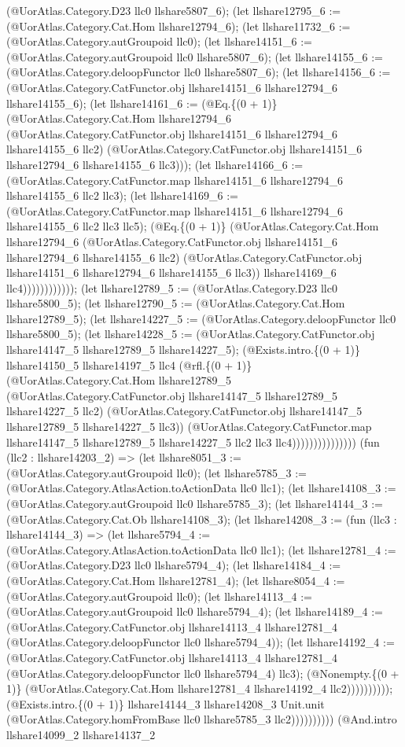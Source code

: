 \documentclass[11pt]{article}
\begin{document}
(@UorAtlas.Category.D23 llc0 llshare5807\_6); (let llshare12795\_6 := (@UorAtlas.Category.Cat.Hom llshare12794\_6); (let llshare11732\_6 := (@UorAtlas.Category.autGroupoid llc0); (let llshare14151\_6 := (@UorAtlas.Category.autGroupoid llc0 llshare5807\_6); (let llshare14155\_6 := (@UorAtlas.Category.deloopFunctor llc0 llshare5807\_6); (let llshare14156\_6 := (@UorAtlas.Category.CatFunctor.obj llshare14151\_6 llshare12794\_6 llshare14155\_6); (let llshare14161\_6 := (@Eq.\{(0 + 1)\} (@UorAtlas.Category.Cat.Hom llshare12794\_6 (@UorAtlas.Category.CatFunctor.obj llshare14151\_6 llshare12794\_6 llshare14155\_6 llc2) (@UorAtlas.Category.CatFunctor.obj llshare14151\_6 llshare12794\_6 llshare14155\_6 llc3))); (let llshare14166\_6 := (@UorAtlas.Category.CatFunctor.map llshare14151\_6 llshare12794\_6 llshare14155\_6 llc2 llc3); (let llshare14169\_6 := (@UorAtlas.Category.CatFunctor.map llshare14151\_6 llshare12794\_6 llshare14155\_6 llc2 llc3 llc5); (@Eq.\{(0 + 1)\} (@UorAtlas.Category.Cat.Hom llshare12794\_6 (@UorAtlas.Category.CatFunctor.obj llshare14151\_6 llshare12794\_6 llshare14155\_6 llc2) (@UorAtlas.Category.CatFunctor.obj llshare14151\_6 llshare12794\_6 llshare14155\_6 llc3)) llshare14169\_6 llc4)))))))))))); (let llshare12789\_5 := (@UorAtlas.Category.D23 llc0 llshare5800\_5); (let llshare12790\_5 := (@UorAtlas.Category.Cat.Hom llshare12789\_5); (let llshare14227\_5 := (@UorAtlas.Category.deloopFunctor llc0 llshare5800\_5); (let llshare14228\_5 := (@UorAtlas.Category.CatFunctor.obj llshare14147\_5 llshare12789\_5 llshare14227\_5); (@Exists.intro.\{(0 + 1)\} llshare14150\_5 llshare14197\_5 llc4 (@rfl.\{(0 + 1)\} (@UorAtlas.Category.Cat.Hom llshare12789\_5 (@UorAtlas.Category.CatFunctor.obj llshare14147\_5 llshare12789\_5 llshare14227\_5 llc2) (@UorAtlas.Category.CatFunctor.obj llshare14147\_5 llshare12789\_5 llshare14227\_5 llc3)) (@UorAtlas.Category.CatFunctor.map llshare14147\_5 llshare12789\_5 llshare14227\_5 llc2 llc3 llc4))))))))))))))) (fun (llc2 : llshare14203\_2) => (let llshare8051\_3 := (@UorAtlas.Category.autGroupoid llc0); (let llshare5785\_3 := (@UorAtlas.Category.AtlasAction.toActionData llc0 llc1); (let llshare14108\_3 := (@UorAtlas.Category.autGroupoid llc0 llshare5785\_3); (let llshare14144\_3 := (@UorAtlas.Category.Cat.Ob llshare14108\_3); (let llshare14208\_3 := (fun (llc3 : llshare14144\_3) => (let llshare5794\_4 := (@UorAtlas.Category.AtlasAction.toActionData llc0 llc1); (let llshare12781\_4 := (@UorAtlas.Category.D23 llc0 llshare5794\_4); (let llshare14184\_4 := (@UorAtlas.Category.Cat.Hom llshare12781\_4); (let llshare8054\_4 := (@UorAtlas.Category.autGroupoid llc0); (let llshare14113\_4 := (@UorAtlas.Category.autGroupoid llc0 llshare5794\_4); (let llshare14189\_4 := (@UorAtlas.Category.CatFunctor.obj llshare14113\_4 llshare12781\_4 (@UorAtlas.Category.deloopFunctor llc0 llshare5794\_4)); (let llshare14192\_4 := (@UorAtlas.Category.CatFunctor.obj llshare14113\_4 llshare12781\_4 (@UorAtlas.Category.deloopFunctor llc0 llshare5794\_4) llc3); (@Nonempty.\{(0 + 1)\} (@UorAtlas.Category.Cat.Hom llshare12781\_4 llshare14192\_4 llc2)))))))))); (@Exists.intro.\{(0 + 1)\} llshare14144\_3 llshare14208\_3 Unit.unit (@UorAtlas.Category.homFromBase llc0 llshare5785\_3 llc2)))))))))) (@And.intro llshare14099\_2 llshare14137\_2 
\end{document}
